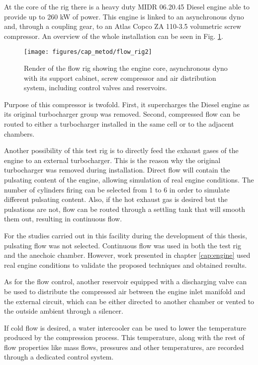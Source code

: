 At the core of the rig there is a heavy duty MIDR 06.20.45 Diesel engine able to provide up to 260 kW of power. This engine is linked to an asynchronous dyno and, through a coupling gear, to an Atlas Copco ZA 110-3.5 volumetric screw compressor. An overview of the whole installation can be seen in Fig. \ref{fig:flowrig_render}.

\begin{figure}[b!]
\centering
\texttt{[image: figures/cap\_metod/flow\_rig2]}
\caption{Render of the flow rig showing the engine core, asynchronous dyno with its support cabinet, screw compressor and air distribution system, including control valves and reservoirs.}
\label{fig:flowrig_render}
\end{figure}

Purpose of this compressor is twofold. First, it supercharges the Diesel engine as its original turbocharger group was removed. Second, compressed flow can be routed to either a turbocharger installed in the same cell or to the adjacent chambers.

Another possibility of this test rig is to directly feed the exhaust gases of the engine to an external turbocharger. This is the reason why the original turbocharger was removed during installation. Direct flow will contain the pulsating content of the engine, allowing simulation of real engine conditions.
The number of cylinders firing can be selected from 1 to 6 in order to simulate different pulsating content. Also, if the hot exhaust gas is desired but the pulsations are not, flow can be routed through a settling tank that will smooth them out, resulting in continuous flow.

For the studies carried out in this facility during the development of this thesis, pulsating flow was not selected. Continuous flow was used in both the test rig and the anechoic chamber. However, work presented in chapter \ref{cap:engine} used real engine conditions to validate the proposed techniques and obtained results.

As for the flow control, another reservoir equipped with a discharging valve can be used to distribute the compressed air between the engine inlet manifold and the external circuit, which can be either directed to another chamber or vented to the outside ambient through a silencer.

If cold flow is desired, a water intercooler can be used to lower the temperature produced by the compression process. This temperature, along with the rest of flow properties like mass flows, pressures and other temperatures, are recorded through a dedicated control system.

